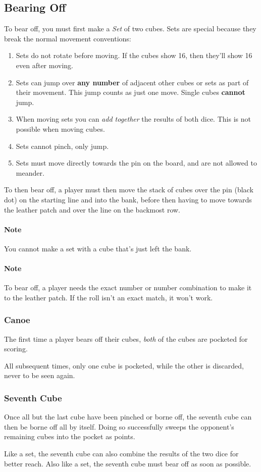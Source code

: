 \subsection{Bearing Off}\label{sec:bearing-off}
To bear off, you must first make a \textit{Set} of two cubes.
Sets are special because they break the normal movement conventions:
\begin{enumerate}
    \item Sets do not rotate before moving. If the cubes show 16, then they'll show 16 even after moving.
    \item Sets can jump over \textbf{any number} of adjacent other cubes or sets as part of their movement. This jump counts as just one move. Single cubes \textbf{cannot} jump.
    \item When moving sets you can \textit{add together} the results of both dice. This is not possible when moving cubes.
    \item Sets cannot pinch, only jump.
    \item Sets must move directly towards the pin on the board, and are not allowed to meander.
\end{enumerate}
To then bear off, a player must then move the stack of cubes over the pin (black dot) on the starting line and into the bank, before then having to move towards the leather patch and over the line on the backmost row.

\paragraph{Note} You cannot make a set with a cube that's just left the bank.

\paragraph{Note} To bear off, a player needs the exact number or number combination to make it to the leather patch. If the roll isn't an exact match, it won't work.

\subsubsection{Canoe}
The first time a player bears off their cubes, \textit{both} of the cubes are pocketed for scoring.

All subsequent times, only one cube is pocketed, while the other is discarded, never to be seen again.

\subsubsection{Seventh Cube}
Once all but the last cube have been pinched or borne off, the seventh cube can then be borne off all by itself.
Doing so successfully sweeps the opponent's remaining cubes into the pocket as points.

Like a set, the seventh cube can also combine the results of the two dice for better reach.
Also like a set, the seventh cube must bear off as soon as possible.
